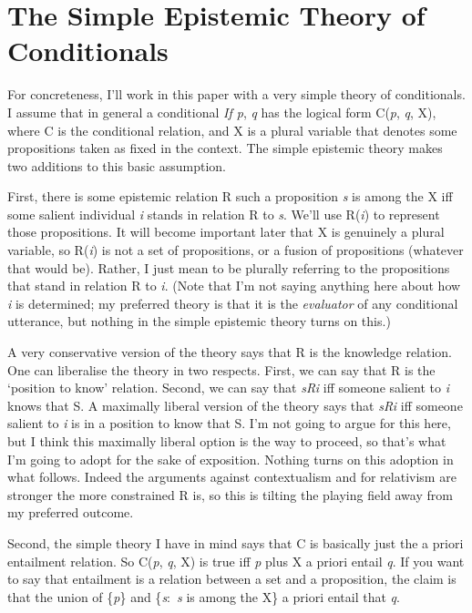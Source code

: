 \documentclass[
  11pt,
  letterpaper,
  DIV=11,
  numbers=noendperiod,
  oneside]{scrartcl}
\begin{document}
\section{The Simple Epistemic Theory of
Conditionals}\label{the-simple-epistemic-theory-of-conditionals}

For concreteness, I'll work in this paper with a very simple theory of
conditionals. I assume that in general a conditional \emph{If p},
\emph{q} has the logical form C(\emph{p}, \emph{q}, X), where C is the
conditional relation, and X is a plural variable that denotes some
propositions taken as fixed in the context. The simple epistemic theory
makes two additions to this basic assumption.

First, there is some epistemic relation R such a proposition \emph{s} is
among the X iff some salient individual \emph{i} stands in relation R to
\emph{s}. We'll use R(\emph{i}) to represent those propositions. It will
become important later that X is genuinely a plural variable, so
R(\emph{i}) is not a set of propositions, or a fusion of propositions
(whatever that would be). Rather, I just mean to be plurally referring
to the propositions that stand in relation R to \emph{i}. (Note that I'm
not saying anything here about how \emph{i} is determined; my preferred
theory is that it is the \emph{evaluator} of any conditional utterance,
but nothing in the simple epistemic theory turns on this.)

A very conservative version of the theory says that R is the knowledge
relation. One can liberalise the theory in two respects. First, we can
say that R is the `position to know' relation. Second, we can say that
\emph{sRi} iff someone salient to \emph{i} knows that S. A maximally
liberal version of the theory says that \emph{sRi} iff someone salient
to \emph{i} is in a position to know that S. I'm not going to argue for
this here, but I think this maximally liberal option is the way to
proceed, so that's what I'm going to adopt for the sake of exposition.
Nothing turns on this adoption in what follows. Indeed the arguments
against contextualism and for relativism are stronger the more
constrained R is, so this is tilting the playing field away from my
preferred outcome.

Second, the simple theory I have in mind says that C is basically just
the a priori entailment relation. So C(\emph{p}, \emph{q}, X) is true
iff \emph{p} plus X a priori entail \emph{q}. If you want to say that
entailment is a relation between a set and a proposition, the claim is
that the union of \{\emph{p}\} and \{\emph{s}:~\emph{s} is among the X\}
a priori entail that \emph{q}.
\end{document}
